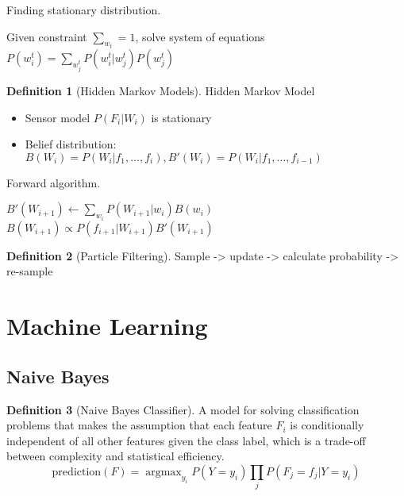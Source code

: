 \documentclass[11pt]{article}
\theoremstyle{definition}
\newtheorem{definition}{Definition}[section]
\theoremstyle{remark}
\DeclareMathOperator*{\argmax}{argmax}
\begin{document}
\begin{algorithm}
    \caption{Finding stationary distribution.}

    
    \DontPrintSemicolon
	    
    Given constraint $\sum_{w_t} = 1$, solve system of equations $P(w_i^t) = \sum_{w_j^t} P(w_i^t | w_j^t) P(w_j^t)$ 
\end{algorithm}

\begin{definition}[Hidden Markov Models]
Hidden Markov Model
\begin{itemize}
\item Sensor model $P(F_i | W_i)$ is stationary
\item Belief distribution: $B(W_i) = P(W_i | f_1, \dots, f_i), B'(W_i) = P(W_i | f_1, \dots, f_{i-1})$
\end{itemize}
\end{definition}

\begin{algorithm}
    \caption{Forward algorithm.}

    
    \DontPrintSemicolon
    
    $B'(W_{i+1}) \gets \sum_{w_i} P(W_{i+1} | w_i)B(w_i)$ 
    $B(W_{i+1}) \propto P(f_{i+1} | W_{i+1}) B'(W_{i+1})$ 
    
\end{algorithm}

\begin{definition}[Particle Filtering] Sample -> update -> calculate probability -> re-sample
\end{definition}
\clearpage

\section{Machine Learning}
\subsection{Naive Bayes}
\begin{definition}[Naive Bayes Classifier]
A model for solving classification problems that makes the assumption that each feature $F_i$ is conditionally independent of all other features given the class label, which is a trade-off between complexity and statistical efficiency.
\[
\mathrm{prediction}(F) = \argmax_{y_i} P(Y=y_i) \prod_j P(F_j=f_j | Y = y_i)
\]
\end{definition}
\end{document}
